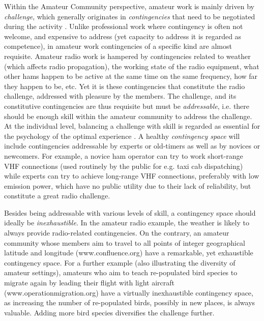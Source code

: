 \documentclass{acm_proc_article-sp}
\begin{document}
Within the Amateur Community perspective, amateur work is mainly driven by \textit{challenge}, which generally originates in \textit{contingencies} that need to be negotiated during the activity \cite{bogdan_bowers07}. Unlike professional work where contingency is often not welcome, and expensive to address (yet capacity to address it is regarded as competence), in amateur work contingencies of a specific kind are almost requisite. Amateur radio work is hampered by contingencies related to weather (which affects radio propagation), the working state of the radio equipment, what other hams happen to be active at the same time on the same frequency, how far they happen to be, etc. Yet it is these contingencies that constitute the radio challenge, addressed with pleasure by the members. The challenge, and its constitutive contingencies are thus requisite but must be \textit{addressable}, i.e. there should be enough skill within  the amateur community to address the challenge. At the individual level, balancing a challenge with skill is regarded as essential for the psychology of the optimal experience \cite{csik90}. A healthy \textit{contingency space} will include contingencies addressable by experts or old-timers as well as by novices or newcomers. For example, a novice ham operator can try to work short-range VHF connections (used routinely by the public for e.g. taxi cab dispatching)  while experts can try to achieve long-range VHF connections, preferably with low emission power, which have no public utility due to their lack of reliability, but constitute a great radio challenge.  

Besides being addressable with various levels of skill, a contingency space should ideally be \textit{inexhaustible}. In the amateur radio example, the weather is likely to always provide radio-related contingencies. On the contrary, an amateur community whose members aim to travel to all points of integer geographical latitude and longitude (www.confluence.org) have a remarkable, yet exhaustible contingency space. For a further example (also illustrating the diversity of amateur settings), amateurs who aim to teach re-populated bird species to migrate again by leading their flight with light aircraft (www.operationmigration.org) have a virtually inexhaustible contingency space, as increasing the number of re-populated birds, possibly in new places, is always valuable. Adding more bird species diversifies the challenge further. 
\end{document}
